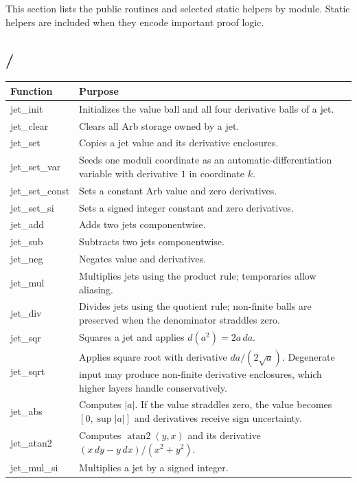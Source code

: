 \documentclass[11pt]{article}
\DeclareRobustCommand{\code}[1]{\texttt{\detokenize{#1}}}
\begin{document}
This section lists the public routines and selected static helpers by module.
Static helpers are included when they encode important proof logic.

\subsection{\code{geom.c}/\code{geom.h}}

\begin{longtable}{>{\ttfamily}p{}p{}}
\toprule
Function & Purpose \\
\midrule
\endhead
jet\_init & Initializes the value ball and all four derivative balls of a jet. \\
jet\_clear & Clears all Arb storage owned by a jet. \\
jet\_set & Copies a jet value and its derivative enclosures. \\
jet\_set\_var & Seeds one moduli coordinate as an automatic-differentiation variable with derivative \(1\) in coordinate \(k\). \\
jet\_set\_const & Sets a constant Arb value and zero derivatives. \\
jet\_set\_si & Sets a signed integer constant and zero derivatives. \\
jet\_add & Adds two jets componentwise. \\
jet\_sub & Subtracts two jets componentwise. \\
jet\_neg & Negates value and derivatives. \\
jet\_mul & Multiplies jets using the product rule; temporaries allow aliasing. \\
jet\_div & Divides jets using the quotient rule; non-finite balls are preserved when the denominator straddles zero. \\
jet\_sqr & Squares a jet and applies \(d(a^2)=2a\,da\). \\
jet\_sqrt & Applies square root with derivative \(da/(2\sqrt a)\).  Degenerate input may produce non-finite derivative enclosures, which higher layers handle conservatively. \\
jet\_abs & Computes \(|a|\).  If the value straddles zero, the value becomes \([0,\sup |a|]\) and derivatives receive sign uncertainty. \\
jet\_atan2 & Computes \(\operatorname{atan2}(y,x)\) and its derivative \((x\,dy-y\,dx)/(x^2+y^2)\). \\
jet\_mul\_si & Multiplies a jet by a signed integer. \\

\end{longtable}
\end{document}
